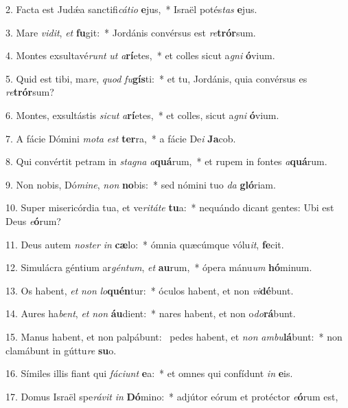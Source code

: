 2. Facta est Judǽa sanctifi\textit{cá}\textit{ti}\textit{o} \textbf{e}jus,~*  Israël potés\textit{tas} \textbf{e}jus.\

3. Mare \textit{vi}\textit{dit}, \textit{et} \textbf{fu}git:~*  Jordánis convérsus est \textit{re}\textbf{trór}sum.\

4. Montes exsultavé\textit{runt} \textit{ut} \textit{a}\textbf{rí}etes,~*  et colles sicut a\textit{gni} \textbf{ó}vium.\

5. Quid est tibi, ma\textit{re}, \textit{quod} \textit{fu}\textbf{gís}ti:~*  et tu, Jordánis, quia convérsus es \textit{re}\textbf{trór}sum?\

6. Montes, exsultástis \textit{sic}\textit{ut} \textit{a}\textbf{rí}etes,~*  et colles, sicut a\textit{gni} \textbf{ó}vium.\

7. A fácie Dómini \textit{mo}\textit{ta} \textit{est} \textbf{ter}ra,~*  a fácie De\textit{i} \textbf{Ja}cob.\

8. Qui convértit petram in \textit{sta}\textit{gna} \textit{a}\textbf{quá}rum,~*  et rupem in fontes \textit{a}\textbf{quá}rum.\

9. Non nobis, Dó\textit{mi}\textit{ne}, \textit{non} \textbf{no}bis:~*  sed nómini tuo \textit{da} \textbf{gló}riam.\

10. Super misericórdia tua, et ve\textit{ri}\textit{tá}\textit{te} \textbf{tu}a:~*  nequándo dicant gentes: Ubi est Deus \textit{e}\textbf{ó}rum?\

11. Deus autem \textit{nos}\textit{ter} \textit{in} \textbf{cæ}lo:~*  ómnia quæcúmque vólu\textit{it}, \textbf{fe}cit.\

12. Simulácra géntium ar\textit{gén}\textit{tum}, \textit{et} \textbf{au}rum,~*  ópera mánu\textit{um} \textbf{hó}minum.\

13. Os habent, \textit{et} \textit{non} \textit{lo}\textbf{quén}tur:~*  óculos habent, et non \textit{vi}\textbf{dé}bunt.\

14. Aures ha\textit{bent}, \textit{et} \textit{non} \textbf{áu}dient:~*  nares habent, et non o\textit{do}\textbf{rá}bunt.\

15. Manus habent, et non palpábunt: \dag\  pedes habent, et \textit{non} \textit{am}\textit{bu}\textbf{lá}bunt:~*  non clamábunt in gúttu\textit{re} \textbf{su}o.\

16. Símiles illis fiant qui \textit{fá}\textit{ci}\textit{unt} \textbf{e}a:~*  et omnes qui confídunt \textit{in} \textbf{e}is.\

17. Domus Israël spe\textit{rá}\textit{vit} \textit{in} \textbf{Dó}mino:~*  adjútor eórum et protéctor \textit{e}\textbf{ó}rum est,\

